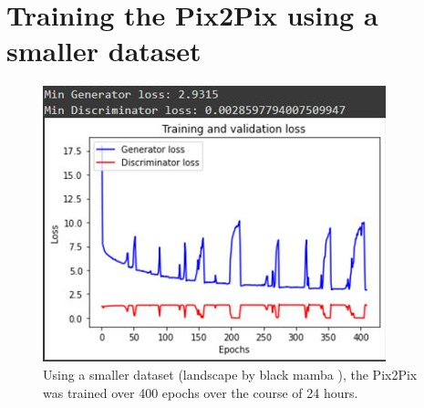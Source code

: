 \section*{Training the Pix2Pix using a smaller dataset}
\begin{figure}[H]
    \centering
    \includegraphics[width=1\columnwidth]{sections/figures/pix2pix_training.JPG}
    \caption{Using a smaller dataset (landscape by black mamba \cite{landscape}), the Pix2Pix was trained over 400 epochs over the course of 24 hours. }
    \label{fig:my_label}
\end{figure}


